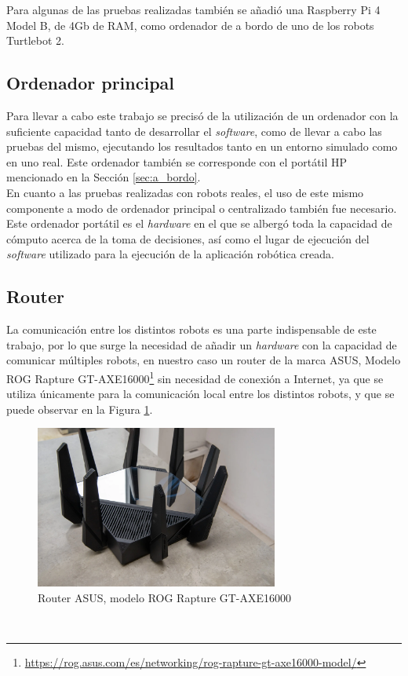 Para algunas de las pruebas realizadas también se añadió una Raspberry Pi 4
Model B, de 4Gb de RAM, como ordenador de a bordo de uno de los robots Turtlebot
2.
\\

\subsection{Ordenador principal}
\label{sec:ordenador_principal}

Para llevar a cabo este trabajo se precisó de la utilización de un ordenador con
la suficiente capacidad tanto de desarrollar el \textit{software}, como de
llevar a cabo las pruebas del mismo, ejecutando los resultados tanto en un
entorno simulado como en uno real.
Este ordenador también se corresponde con el portátil HP mencionado en la
Sección \ref{sec:a_bordo}.
\\

En cuanto a las pruebas realizadas con robots reales, el uso de este mismo
componente a modo de ordenador principal o centralizado también fue necesario.
Este ordenador portátil es el \textit{hardware} en el que se albergó toda la
capacidad de cómputo acerca de la toma de decisiones, así como el lugar de
ejecución del \textit{software} utilizado para la ejecución de la aplicación
robótica creada.
\\

\subsection{Router}
\label{sec:router}

La comunicación entre los distintos robots es una parte indispensable de este
trabajo, por lo que surge la necesidad de añadir un \textit{hardware} con la
capacidad de comunicar múltiples robots, en nuestro caso un router de la marca
ASUS, Modelo ROG Rapture
GT-AXE16000\footnote{
\href{https://rog.asus.com/es/networking/rog-rapture-gt-axe16000-model/}{https://rog.asus.com/es/networking/rog-rapture-gt-axe16000-model/}}
sin necesidad de conexión a Internet, ya que se utiliza únicamente para la
comunicación local entre los distintos robots, y que se puede observar en la
Figura \ref{fig:asus_router}.
\\

\begin{figure} [h!]
  \begin{center}
    \includegraphics[width=8cm]{figs/asus_router}
  \end{center}
  \caption{Router ASUS, modelo ROG Rapture GT-AXE16000 \cite{asus_router}}
  \label{fig:asus_router}
\end{figure}\


